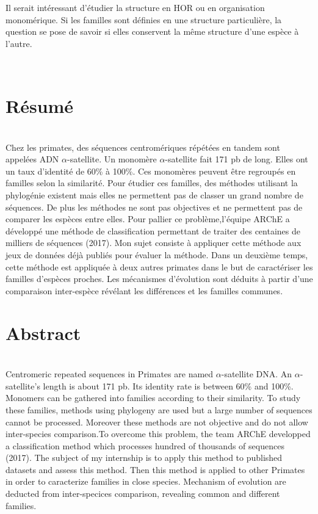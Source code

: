 \documentclass[12pt,a4paper]{article}
\begin{document}
	Il serait intéressant d'étudier la structure en HOR ou en organisation monomérique. Si les familles sont définies en une structure particulière, la question se pose de savoir si elles conservent la même structure d'une espèce à l'autre.

\newpage
\strut  ~  \mbox{}  \null
\newpage
  

\newpage 
\thispagestyle{empty}
\section*{Résumé}~\\[0.2cm]
Chez les primates, des séquences centromériques répétées en tandem sont appelées ADN $\alpha$-satellite. Un monomère $\alpha$-satellite fait 171 pb de long. Elles ont un taux d'identité de 60\% à 100\%. Ces monomères peuvent être regroupés en familles selon la similarité. Pour étudier ces familles, des méthodes utilisant la phylogénie existent mais elles ne permettent pas de classer un grand nombre de séquences. De plus les méthodes ne sont pas objectives et ne permettent pas de comparer les espèces entre elles. Pour pallier ce problème,l'équipe ARChE a développé une méthode de classification permettant de traiter des centaines de milliers de séquences (2017). Mon sujet consiste à appliquer cette méthode aux jeux de données déjà publiés pour évaluer la méthode. Dans un deuxième temps, cette méthode est appliquée à deux autres primates dans le but de  caractériser les familles d'espèces proches. Les mécanismes d'évolution sont déduits à partir d'une comparaison inter-espèce révélant les différences et les familles communes. 

\section*{Abstract}~\\[0.2cm]
Centromeric repeated sequences in Primates are named $\alpha$-satellite DNA. An $\alpha$-satellite's length is about 171 pb. Its identity rate is between 60\% and 100\%. Monomers can be gathered into families according to their similarity. To study these families, methods using phylogeny are used but a large number of sequences cannot be processed. Moreover these methods are not objective and do not allow inter-species comparison.To overcome this problem, the team ARChE developped a classification method which processes hundred of thousands of sequences (2017). The subject of my internship is to apply this method to published datasets and assess this method. Then this method is applied to other Primates in order to caracterize families in close species. Mechanism of evolution are deducted from inter-specices comparison, revealing common and different families. 
\end{document}
